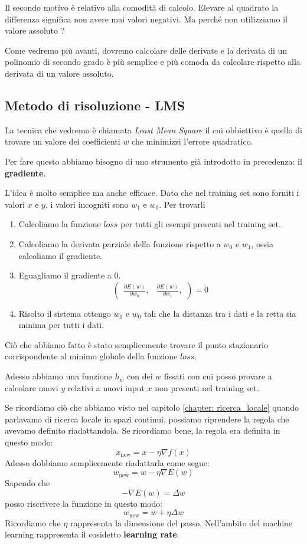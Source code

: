 Il secondo motivo \`e relativo alla comodit\`a di calcolo. Elevare al quadrato la differenza significa non avere mai valori
negativi. Ma perch\'e non utilizziamo il valore assoluto ?

Come vedremo pi\`u avanti, dovremo calcolare delle derivate e la derivata di un polinomio di secondo grado \`e pi\`u
semplice e pi\`u comoda da calcolare rispetto alla derivata di un valore assoluto.

\subsection{Metodo di risoluzione - LMS}
La tecnica che vedremo \`e chiamata \emph{Least Mean Square} il cui obbiettivo \`e quello di trovare un valore dei
coefficienti $w$ che minimizzi l'errore quadratico.

Per fare questo abbiamo bisogno di uno strumento gi\`a introdotto in precedenza: il \textbf{gradiente}.

L'idea \`e molto semplice ma anche efficace. Dato che nel training set sono forniti i valori $x$ e $y$, i valori incogniti
sono $w_1$ e $w_0$. Per trovarli
\begin{enumerate}
	\item Calcoliamo la funzione $loss$ per tutti gli esempi presenti nel training set.
	\item Calcoliamo la derivata parziale della funzione rispetto a $w_0$ e $w_1$, ossia calcoliamo il gradiente.
	\item Eguagliamo il gradiente a 0.
	      \[
		      \begin{pmatrix}
			      \displaystyle\frac{ \partial E(w) }{ \partial w_0 }, &
			      \displaystyle\frac{ \partial E(w) }{ \partial w_1 },
		      \end{pmatrix} = 0
	      \]
	\item Risolto il sistema ottengo $w_1$ e $w_0$ tali che la distanza tra i dati e la retta sia minima per tutti i dati.
\end{enumerate}
Ci\`o che abbiamo fatto \`e stato semplicemente trovare il punto stazionario corrispondente al minimo globale della funzione
$loss$.

Adesso abbiamo una funzione $h_w$ con dei $w$ fissati con cui posso provare a calcolare nuovi $y$ relativi a nuovi
input $x$ non presenti nel training set.

Se ricordiamo ci\`o che abbiamo visto nel capitolo \ref{chapter: ricerca_locale} quando parlavamo di ricerca locale in spazi
continui, possiamo riprendere la regola che avevamo definito riadattandola. Se ricordiamo bene, la regola era definita
in questo modo:
\[ x_{\text{new}} = x - \eta \nabla f(x) \]
Adesso dobbiamo semplicemente riadattarla come segue:
\[ w_{\text{new}} = w - \eta \nabla E(w) \]
Sapendo che
\[ -\nabla E(w) = \Delta w \]
posso riscrivere la funzione in questo modo:
\[ w_{\text{new}} = w + \eta \Delta w \]
Ricordiamo che $\eta$ rappresenta la dimensione del passo. Nell'ambito del machine learning rappresenta il cosidetto
\textbf{learning rate}.

